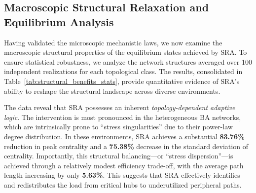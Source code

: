 \documentclass{ccjnl}
\begin{document}
\subsection{Macroscopic Structural Relaxation and Equilibrium Analysis}
\label{subsec:dynamic_relaxation}

\begin{table}[h!]
\centering
\caption{Analysis of Structural Optimization Benefits of SRA (Mean $\pm$ Std Dev over 100 runs)}
\label{tab:structural_benefits_stats}
\end{table}

Having validated the microscopic mechanistic laws, we now examine the macroscopic structural properties of the equilibrium states achieved by SRA. 
To ensure statistical robustness, we analyze the network structures averaged over 100 independent realizations for each topological class. 
The results, consolidated in Table~\ref{tab:structural_benefits_stats}, provide quantitative evidence of SRA's ability to reshape the structural landscape across diverse environments.

The data reveal that SRA possesses an inherent \textit{topology-dependent adaptive logic}. 
The intervention is most pronounced in the heterogeneous BA networks, which are intrinsically prone to ``stress singularities'' due to their power-law degree distribution. 
In these environments, SRA achieves a substantial \textbf{83.76\%} reduction in peak centrality and a \textbf{75.38\%} decrease in the standard deviation of centrality. 
Importantly, this structural balancing—or ``stress dispersion''—is achieved through a relatively modest efficiency trade-off, with the average path length increasing by only \textbf{5.63\%}. 
This suggests that SRA effectively identifies and redistributes the load from critical hubs to underutilized peripheral paths.
\end{document}
